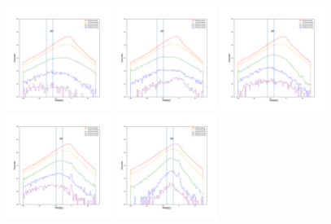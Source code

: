 \documentclass[12pt,prd]{article}
\begin{document}
\begin{figure}[h!]
\includegraphics[width=0.3\textwidth]{../figures/scanning_plotsgaiascan_l101_2_b58_4_ra212_7_dec55_2_npy_5.pdf}
\includegraphics[width=0.3\textwidth]{../figures/scanning_plotsgaiascan_l101_2_b58_4_ra212_7_dec55_2_npy_6.pdf}
\includegraphics[width=0.3\textwidth]{../figures/scanning_plotsgaiascan_l101_2_b58_4_ra212_7_dec55_2_npy_7.pdf}
\includegraphics[width=0.3\textwidth]{../figures/scanning_plotsgaiascan_l101_2_b58_4_ra212_7_dec55_2_npy_8.pdf}
\includegraphics[width=0.3\textwidth]{../figures/scanning_plotsgaiascan_l101_2_b58_4_ra212_7_dec55_2_npy_9.pdf}

\end{figure}
\end{document}

